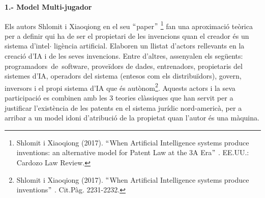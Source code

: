 \documentclass[12pt]{article}
\renewcommand{\_}{\kern-1.5pt\textunderscore\kern-1.5pt}
\begin{document}
\begin{itemize}
\vspace{\baselineskip}
\begin{justify}
\textbf{1.- Model Multi-jugador }
\end{justify}\par


\vspace{\baselineskip}
\begin{justify}
Els autors Shlomit i Xiaoqiong en el seu $``$paper$"$ \footnote{ Shlomit i Xiaoqiong (2017). $``$When Artificial Intelligence systems produce inventions: an alternative model for Patent Law at the 3A Era$"$ . EE.UU.: Cardozo Law Review.  } fan una aproximació teòrica per a definir qui ha de ser el propietari de les invencions quan el creador és un sistema d’intel$ \cdot $ ligència artificial. Elaboren un llistat d’actors rellevants en la creació d’IA i de les seves invencions. Entre d’altres, assenyalen els següents: programadors\ de\ software, proveïdors de dades, entrenadors, propietaris del sistemes d’IA,  operadors del sistema (entesos com els distribuïdors), govern,  inversors i el propi sistema d’IA que és autònom\footnote{ Shlomit i Xiaoqiong (2017). $``$When Artificial Intelligence systems produce inventions$"$ . Cit.Pàg. 2231-2232. }. Aquests actors i la seva participació es combinen amb les 3 teories clàssiques que han servit per a justificar l’existència de les patents en el sistema jurídic nord-americà, per a arribar a un model idoni d’atribució de la propietat quan l’autor és una màquina. 
\end{justify}\par


\vspace{\baselineskip}
\begin{justify}

\end{justify}\par



\end{itemize}
\end{document}
